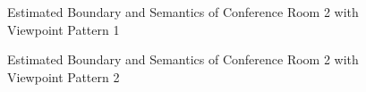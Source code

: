 \documentclass[11pt, a4paper,oneside,chapterprefix=false]{scrbook}
\begin{document}
\begin{figure}[H]
    \centering
      \label{fig:conf2 b 200 0} \hfill
     \label{fig:conf2 s 200 0}
    \caption{Estimated Boundary and Semantics of Conference Room 2 with Viewpoint Pattern 1}
    \label{fig:conf2 0}
\end{figure}

\begin{figure}[H]
    \centering
      \label{fig:conf2 b 200 4} \hfill
     \label{fig:conf2 s 200 4}
    \caption{Estimated Boundary and Semantics of Conference Room 2 with Viewpoint Pattern 2}
    \label{fig:conf2 4}
\end{figure}
\end{document}
